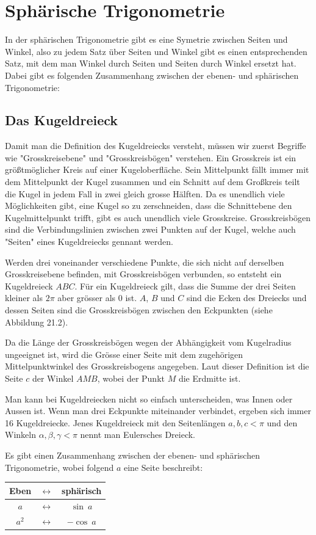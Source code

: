 
\section{Sphärische Trigonometrie}
In der sphärischen Trigonometrie gibt es eine Symetrie zwischen Seiten und Winkel, also zu jedem Satz über Seiten und Winkel gibt es einen entsprechenden Satz, mit dem man Winkel durch Seiten und Seiten durch Winkel ersetzt hat.
Dabei gibt es folgenden Zusammenhang zwischen der ebenen- und sphärischen Trigonometrie:

\subsection{Das Kugeldreieck}
Damit man die Definition des Kugeldreiecks versteht, müssen wir zuerst Begriffe wie "Grosskreisebene" und "Grosskreisbögen" verstehen.
Ein Grosskreis ist ein größtmöglicher Kreis auf einer Kugeloberfläche.
Sein Mittelpunkt fällt immer mit dem Mittelpunkt der Kugel zusammen und ein Schnitt auf dem Großkreis teilt die Kugel in jedem Fall in zwei gleich grosse Hälften.
Da es unendlich viele Möglichkeiten gibt, eine Kugel so zu zerschneiden, dass die Schnittebene den Kugelmittelpunkt trifft, gibt es auch unendlich viele Grosskreise.
Grosskreisbögen sind die Verbindungslinien zwischen zwei Punkten auf der Kugel, welche auch "Seiten" eines Kugeldreiecks gennant werden.

Werden drei voneinander verschiedene Punkte, die sich nicht auf derselben Grosskreisebene befinden, mit Grosskreisbögen verbunden, so entsteht ein Kugeldreieck $ABC$.
Für ein Kugeldreieck gilt, dass die Summe der drei Seiten kleiner als $2\pi$ aber grösser als 0 ist.
$A$, $B$ und $C$ sind die Ecken des Dreiecks und dessen Seiten sind die Grosskreisbögen zwischen den Eckpunkten (siehe Abbildung 21.2). 

Da die Länge der Grosskreisbögen wegen der Abhängigkeit vom Kugelradius ungeeignet ist, wird die Grösse einer Seite mit dem zugehörigen Mittelpunktwinkel des Grosskreisbogens angegeben. 
Laut dieser Definition ist die Seite $c$ der Winkel $AMB$, wobei der Punkt $M$ die Erdmitte ist.

Man kann bei Kugeldreiecken nicht so einfach unterscheiden, was Innen oder Aussen ist. 
Wenn man drei Eckpunkte miteinander verbindet, ergeben sich immer 16 Kugeldreiecke. 
Jenes Kugeldreieck mit den Seitenlängen $a, b, c < \pi$ und den Winkeln $\alpha, \beta, \gamma < \pi$ nennt man Eulersches Dreieck.

Es gibt einen Zusammenhang zwischen der ebenen- und sphärischen Trigonometrie, wobei folgend $a$ eine Seite beschreibt:
\begin{center}
	\begin{tabular}{ccc}
		Eben & $\leftrightarrow$ & sphärisch \\
		\hline
		$a$ & $\leftrightarrow$  & $\sin \ a$  \\
		
		$a^2$ & $\leftrightarrow$  & $-\cos \ a$ \\
	\end{tabular}
\end{center}

